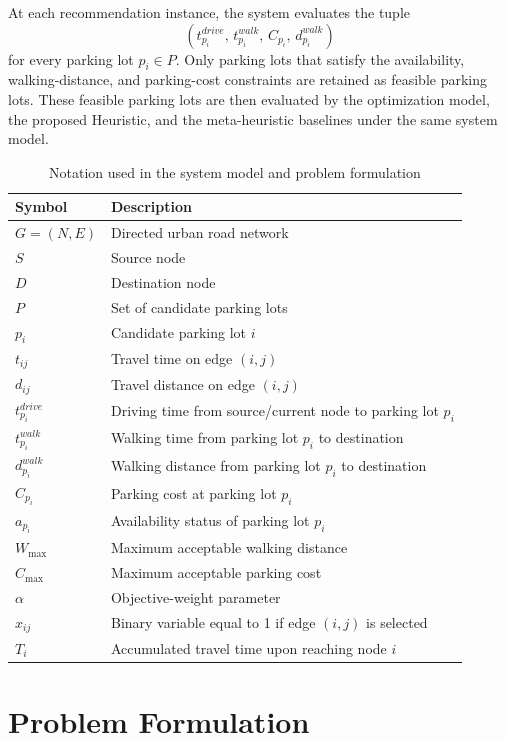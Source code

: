 At each recommendation instance, the system evaluates the tuple
\[
(t^{drive}_{p_i},\, t^{walk}_{p_i},\, C_{p_i},\, d^{walk}_{p_i})
\]
for every parking lot \(p_i \in P\). Only parking lots that satisfy the availability, walking-distance, and parking-cost constraints are retained as feasible parking lots. These feasible parking lots are then evaluated by the optimization model, the proposed Heuristic, and the meta-heuristic baselines under the same system model.

\begin{table}[t]
\centering
\caption{Notation used in the system model and problem formulation}
\label{tab:notation}
\small
\begin{tabularx}{\linewidth}{l X}
\hline
\textbf{Symbol} & \textbf{Description} \\
\hline
\(G=(N,E)\) & Directed urban road network \\
\(S\) & Source node \\
\(D\) & Destination node \\
\(P\) & Set of candidate parking lots \\
\(p_i\) & Candidate parking lot \(i\) \\
\(t_{ij}\) & Travel time on edge \((i,j)\) \\
\(d_{ij}\) & Travel distance on edge \((i,j)\) \\
\(t^{drive}_{p_i}\) & Driving time from source/current node to parking lot \(p_i\) \\
\(t^{walk}_{p_i}\) & Walking time from parking lot \(p_i\) to destination \\
\(d^{walk}_{p_i}\) & Walking distance from parking lot \(p_i\) to destination \\
\(C_{p_i}\) & Parking cost at parking lot \(p_i\) \\
\(a_{p_i}\) & Availability status of parking lot \(p_i\) \\
\(W_{\max}\) & Maximum acceptable walking distance \\
\(C_{\max}\) & Maximum acceptable parking cost \\
\(\alpha\) & Objective-weight parameter \\
\(x_{ij}\) & Binary variable equal to 1 if edge \((i,j)\) is selected \\
\(T_i\) & Accumulated travel time upon reaching node \(i\) \\
\hline
\end{tabularx}
\end{table}

\section{Problem Formulation}

